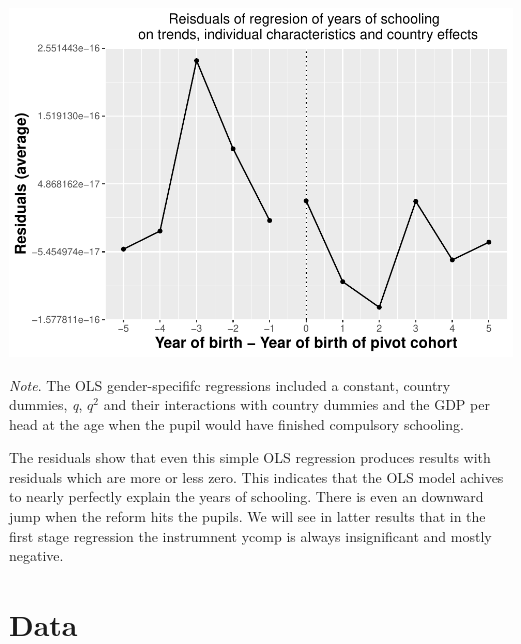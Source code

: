 \documentclass[12pt,a4paper]{article}
\let\origfigure\figure
\let\endorigfigure\endfigure
\renewenvironment{figure}[1][2] {
    \expandafter\origfigure\expandafter[H]
} {
    \endorigfigure
}
\begin{document}
\begin{figure}
\centering
\includegraphics{term_paper_eem_files/figure-latex/unnamed-chunk-1-1.pdf}
\caption{\emph{The Effect of School Reforms on Educational Attainment}}
\end{figure}

\textit{Note}. The OLS gender-specififc regressions included a constant,
country dummies, \textit{q}, \textit{$q^2$} and their interactions with
country dummies and the GDP per head at the age when the pupil would
have finished compulsory schooling.

The residuals show that even this simple OLS regression produces results
with residuals which are more or less zero. This indicates that the OLS
model achives to nearly perfectly explain the years of schooling. There
is even an downward jump when the reform hits the pupils. We will see in
latter results that in the first stage regression the instrumnent ycomp
is always insignificant and mostly negative.

\hypertarget{data}{%
\section{Data}\label{data}}
\end{document}

